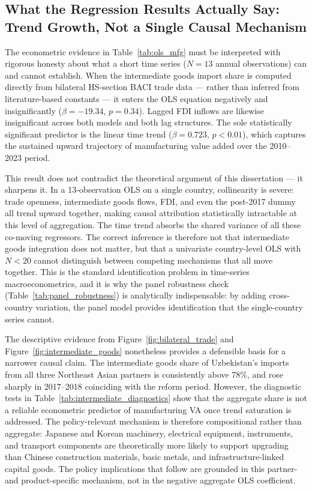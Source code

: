 \subsection{What the Regression Results Actually Say: Trend Growth, Not a Single Causal Mechanism}

The econometric evidence in Table~\ref{tab:ols_mfg} must be interpreted with rigorous honesty about what a short time series ($N = 13$ annual observations) can and cannot establish. When the intermediate goods import share is computed directly from bilateral HS-section BACI trade data --- rather than inferred from literature-based constants --- it enters the OLS equation negatively and insignificantly ($\beta = -19.34$, $p = 0.34$). Lagged FDI inflows are likewise insignificant across both models and both lag structures. The sole statistically significant predictor is the linear time trend ($\beta = 0.723$, $p < 0.01$), which captures the sustained upward trajectory of manufacturing value added over the 2010--2023 period.

This result does not contradict the theoretical argument of this dissertation --- it sharpens it. In a 13-observation OLS on a single country, collinearity is severe: trade openness, intermediate goods flows, FDI, and even the post-2017 dummy all trend upward together, making causal attribution statistically intractable at this level of aggregation. The time trend absorbs the shared variance of all these co-moving regressors. The correct inference is therefore not that intermediate goods integration does not matter, but that a univariate country-level OLS with $N < 20$ cannot distinguish between competing mechanisms that all move together. This is the standard identification problem in time-series macroeconometrics, and it is why the panel robustness check (Table~\ref{tab:panel_robustness}) is analytically indispensable: by adding cross-country variation, the panel model provides identification that the single-country series cannot.

The descriptive evidence from Figure~\ref{fig:bilateral_trade} and Figure~\ref{fig:intermediate_goods} nonetheless provides a defensible basis for a narrower causal claim. The intermediate goods share of Uzbekistan's imports from all three Northeast Asian partners is consistently above 78\%, and rose sharply in 2017--2018 coinciding with the reform period. However, the diagnostic tests in Table~\ref{tab:intermediate_diagnostics} show that the aggregate share is not a reliable econometric predictor of manufacturing VA once trend saturation is addressed. The policy-relevant mechanism is therefore compositional rather than aggregate: Japanese and Korean machinery, electrical equipment, instruments, and transport components are theoretically more likely to support upgrading than Chinese construction materials, basic metals, and infrastructure-linked capital goods. The policy implications that follow are grounded in this partner- and product-specific mechanism, not in the negative aggregate OLS coefficient.

